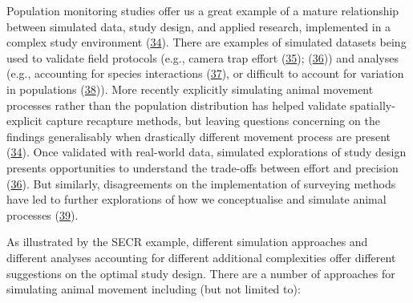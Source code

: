 \documentclass[10pt,a4paper]{article}
\begin{document}
Population monitoring studies offer us a great example of a mature relationship between simulated data, study design, and applied research, implemented in a complex study environment (\protect\hyperlink{ref-theng_confronting_2022}{34}).
There are examples of simulated datasets being used to validate field protocols (e.g., camera trap effort (\protect\hyperlink{ref-howe_distance_2017}{35}); (\protect\hyperlink{ref-cappelle_estimating_2021}{36})) and analyses (e.g., accounting for species interactions (\protect\hyperlink{ref-kellner_two-species_2022}{37}), or difficult to account for variation in populations (\protect\hyperlink{ref-milleret_estimating_2022}{38})).
More recently explicitly simulating animal movement processes rather than the population distribution has helped validate spatially-explicit capture recapture methods, but leaving questions concerning on the findings generalisably when drastically different movement process are present (\protect\hyperlink{ref-theng_confronting_2022}{34}).
Once validated with real-world data, simulated explorations of study design presents opportunities to understand the trade-offs between effort and precision (\protect\hyperlink{ref-cappelle_estimating_2021}{36}).
But similarly, disagreements on the implementation of surveying methods have led to further explorations of how we conceptualise and simulate animal processes (\protect\hyperlink{ref-abolaffio_avoiding_2019}{39}).

As illustrated by the SECR example, different simulation approaches and different analyses accounting for different additional complexities offer different suggestions on the optimal study design.
There are a number of approaches for simulating animal movement including (but not limited to):
\end{document}
